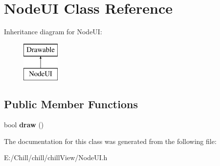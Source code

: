 \hypertarget{class_node_u_i}{}\section{Node\+UI Class Reference}
\label{class_node_u_i}
Inheritance diagram for Node\+UI\+:\begin{figure}[H]
\begin{center}
\leavevmode
\includegraphics[height=2.000000cm]{class_node_u_i}
\end{center}
\end{figure}
\subsection*{Public Member Functions}
\begin{DoxyCompactItemize}
\item 
\mbox{\label{class_node_u_i_a1b67e1f71a026866dd5e42fbe3e8aea2}} 
bool {\bfseries draw} ()
\end{DoxyCompactItemize}


The documentation for this class was generated from the following file\+:\begin{DoxyCompactItemize}
\item 
E\+:/\+Chill/chill/chill\+View/Node\+U\+I.\+h\end{DoxyCompactItemize}
